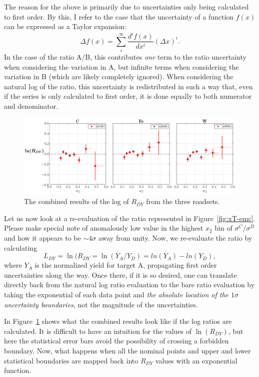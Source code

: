 The reason for the above is primarily due to uncertainties only being calculated to first order.  By this, I refer to the case that the uncertainty of a function $f(x)$ can be expressed as a Taylor expansion:
\begin{equation}
\Delta f(x) = \sum\limits_i^\infty \frac{d^i f(x)}{dx^i} (\Delta x)^i.
\end{equation}
In the case of the ratio A/B, this contributes \emph{one} term to the ratio uncertainty when considering the variation in A, but infinite terms when considering the variation in B (which are likely completely ignored). When considering the natural log of the ratio, this uncertainty is redistributed in such a way that, even if the series is only calculated to first order, it is done equally to both numerator and denominator.

\begin{figure}
	\centering
	\includegraphics[width=\textwidth]{figures/results/xt-emc-log.png}
	\caption{The combined results of the log of $R_{DY}$ from the three roadsets.}
	\label{fig:xt-emc-log}
\end{figure}

Let us now look at a re-evaluation of the ratio represented in Figure~\ref{fig:xT-emc}. Please make special note of anomalously low value in the highest $x_2$ bin of $\sigma^C/\sigma^D$ and how it appears to be $\sim4\sigma$ away from unity. Now, we re-evaluate the ratio by calculating
\begin{equation}
L_{DY} = \ln(R_{DY} = \ln(Y_A/Y_D) = ln(Y_A) - ln(Y_D),
\end{equation}
where $Y_A$ is the normalized yield for target A, propagating first order uncertainties along the way. Once there, if it is so desired, one can translate directly back from the natural log ratio evaluation to the  bare ratio evaluation by taking the exponential of each data point and \emph{the absolute location of the $1\sigma$ uncertainty boundaries}, not the magnitude of the uncertainties.

In Figure~\ref{fig:xt-emc-log} shows what the combined results look like if the log ratios are calculated. It is difficult to have an intuition for the values of $\ln(R_{DY})$, but here the statistical error bars avoid the possibility of crossing a forbidden boundary. Now, what happens when all the nominal points and upper and lower statistical boundaries are mapped back into $R_{DY}$ values with an exponential function.

